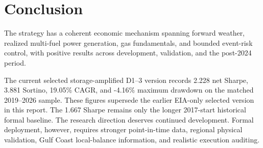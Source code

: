\documentclass[11pt,a4paper]{article}
\begin{document}
\section{Conclusion}

The strategy has a coherent economic mechanism spanning forward weather,
realized multi-fuel power generation, gas fundamentals, and bounded event-risk
control, with positive results across development, validation, and the
post-2024 period.

The current selected storage-amplified D1--3 version records 2.228 net Sharpe,
3.881 Sortino, 19.05\% CAGR, and -4.16\% maximum drawdown on the matched
2019--2026 sample. These figures supersede the earlier EIA-only selected
version in this report. The 1.667 Sharpe remains only the longer 2017-start
historical formal baseline.
The research direction deserves continued development. Formal deployment,
however, requires stronger point-in-time data, regional physical validation,
Gulf Coast local-balance information, and realistic execution auditing.
\end{document}
